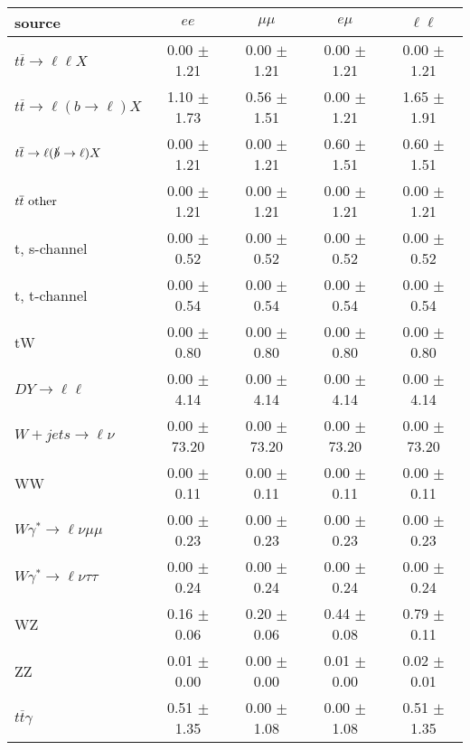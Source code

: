 \begin{tabular}{l|cccc} \hline\hline
source & $ee$ & $\mu\mu$ & $e\mu$ & $\ell\ell $ \\
\hline
$t\overline{t} \rightarrow \ell \ell X$ &  0.00 $\pm$  1.21 &  0.00 $\pm$  1.21 &  0.00 $\pm$  1.21 &  0.00 $\pm$  1.21 \\
$t\overline{t} \rightarrow \ell (b \rightarrow \ell) X$ &  1.10 $\pm$  1.73 &  0.56 $\pm$  1.51 &  0.00 $\pm$  1.21 &  1.65 $\pm$  1.91 \\
$t\overline{t} \rightarrow \ell (\slashed b \rightarrow \ell) X$ &  0.00 $\pm$  1.21 &  0.00 $\pm$  1.21 &  0.60 $\pm$  1.51 &  0.60 $\pm$  1.51 \\
        $t\overline{t}\ \rm{other}$ &  0.00 $\pm$  1.21 &  0.00 $\pm$  1.21 &  0.00 $\pm$  1.21 &  0.00 $\pm$  1.21 \\
\hline
                       t, s-channel &  0.00 $\pm$  0.52 &  0.00 $\pm$  0.52 &  0.00 $\pm$  0.52 &  0.00 $\pm$  0.52 \\
                       t, t-channel &  0.00 $\pm$  0.54 &  0.00 $\pm$  0.54 &  0.00 $\pm$  0.54 &  0.00 $\pm$  0.54 \\
                                 tW &  0.00 $\pm$  0.80 &  0.00 $\pm$  0.80 &  0.00 $\pm$  0.80 &  0.00 $\pm$  0.80 \\
\hline
         $DY \rightarrow \ell \ell$ &  0.00 $\pm$  4.14 &  0.00 $\pm$  4.14 &  0.00 $\pm$  4.14 &  0.00 $\pm$  4.14 \\
      $W+jets \rightarrow \ell \nu$ &  0.00 $\pm$ 73.20 &  0.00 $\pm$ 73.20 &  0.00 $\pm$ 73.20 &  0.00 $\pm$ 73.20 \\
                                 WW &  0.00 $\pm$  0.11 &  0.00 $\pm$  0.11 &  0.00 $\pm$  0.11 &  0.00 $\pm$  0.11 \\
\hline
$W\gamma^{*} \rightarrow \ell \nu \mu\mu$ &  0.00 $\pm$  0.23 &  0.00 $\pm$  0.23 &  0.00 $\pm$  0.23 &  0.00 $\pm$  0.23 \\
$W\gamma^{*} \rightarrow \ell \nu \tau\tau$ &  0.00 $\pm$  0.24 &  0.00 $\pm$  0.24 &  0.00 $\pm$  0.24 &  0.00 $\pm$  0.24 \\
                                 WZ &  0.16 $\pm$  0.06 &  0.20 $\pm$  0.06 &  0.44 $\pm$  0.08 &  0.79 $\pm$  0.11 \\
                                 ZZ &  0.01 $\pm$  0.00 &  0.00 $\pm$  0.00 &  0.01 $\pm$  0.00 &  0.02 $\pm$  0.01 \\
\hline
              $t\overline{t}\gamma$ &  0.51 $\pm$  1.35 &  0.00 $\pm$  1.08 &  0.00 $\pm$  1.08 &  0.51 $\pm$  1.35 \\

\end{tabular}
